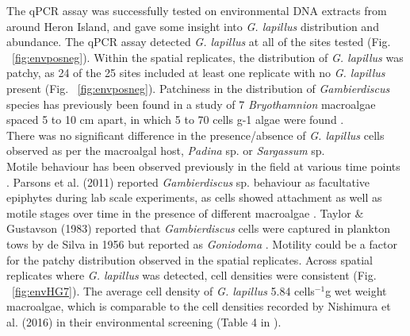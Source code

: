 \documentclass[12pt]{article}
\begin{document}
The qPCR assay was successfully tested on environmental DNA extracts from around Heron Island, and gave some insight into \emph{G. lapillus} distribution and abundance. 
The qPCR assay detected \emph{G. lapillus} at all of the sites tested (Fig. ~\ref{fig:envposneg}). 
Within the spatial replicates, the distribution of \emph{G. lapillus} was patchy, as 24 of the 25 sites included at least one replicate with no \textit{G. lapillus} present (Fig. ~\ref{fig:envposneg}). 
Patchiness in the distribution of \textit{Gambierdiscus} species has previously been found in a study of 7 \emph{Bryothamnion} macroalgae spaced 5 to 10 cm apart, in which 5 to 70 cells g-1 algae were found \citep{taylor1986underwater}.\\
There was no significant difference in the presence/absence of \emph{G. lapillus} cells observed as per the macroalgal host, \emph{Padina} sp. or \emph{Sargassum} sp.\\
Motile behaviour has been observed previously in the field at various time points \citep{yasumoto1977finding,bomber1987ecology}. 
Parsons et al. (2011) reported \emph{Gambierdiscus} sp. behaviour as facultative epiphytes during lab scale experiments, as cells showed attachment as well as motile stages over time in the presence of different macroalgae \citep{parsons2011examination}. 
Taylor \& Gustavson (1983) reported that \emph{Gambierdiscus} cells were captured in plankton tows by de Silva in 1956 but reported as \emph{Goniodoma} \citep{taylor1986underwater}.
Motility could be a factor for the patchy distribution observed in the spatial replicates. 
Across spatial replicates where \emph{G. lapillus} was detected, cell densities were consistent (Fig. ~\ref{fig:envHG7}). 
The average cell density of \emph{G. lapillus} 5.84 cells$^{-1}$g wet weight macroalgae, which is comparable to the cell densities recorded by Nishimura et al. (2016) in their environmental screening (Table 4 in \citep{nishimura2016quantitative}).\\
\end{document}
